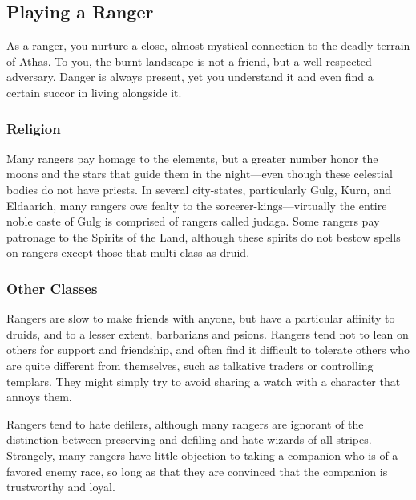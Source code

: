 \subsection{Playing a Ranger}
As a ranger, you nurture a close, almost mystical connection to the deadly terrain of Athas. To you, the burnt landscape is not a friend, but a well-respected adversary. Danger is always present, yet you understand it and even find a certain succor in living alongside it.

\subsubsection{Religion}
Many rangers pay homage to the elements, but a greater number honor the moons and the stars that guide them in the night---even though these celestial bodies do not have priests. In several city-states, particularly Gulg, Kurn, and Eldaarich, many rangers owe fealty to the sorcerer-kings---virtually the entire noble caste of Gulg is comprised of rangers called judaga. Some rangers pay patronage to the Spirits of the Land, although these spirits do not bestow spells on rangers except those that multi-class as druid.

\subsubsection{Other Classes}
Rangers are slow to make friends with anyone, but have a particular affinity to druids, and to a lesser extent, barbarians and psions. Rangers tend not to lean on others for support and friendship, and often find it difficult to tolerate others who are quite different from themselves, such as talkative traders or controlling templars. %
They might simply try to avoid sharing a watch with a character that annoys them.

Rangers tend to hate defilers, although many rangers are ignorant of the distinction between preserving and defiling and hate wizards of all stripes. Strangely, many rangers have little objection to taking a companion who is of a favored enemy race, so long as that they are convinced that the companion is trustworthy and loyal.



